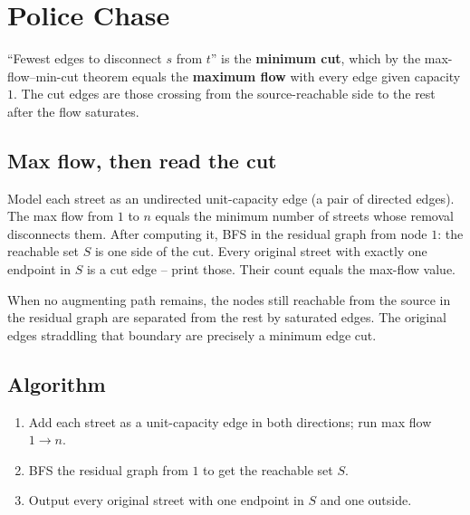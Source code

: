 \section{Police Chase}
\label{sec:cses-police-chase}


\begin{patternbox}
``Fewest edges to disconnect $s$ from $t$'' is the \textbf{minimum cut},
which by the max-flow--min-cut theorem equals the \textbf{maximum flow} with
every edge given capacity $1$. The cut edges are those crossing from the
source-reachable side to the rest after the flow saturates.
\end{patternbox}

\subsection*{Max flow, then read the cut}

Model each street as an undirected unit-capacity edge (a pair of directed
edges). The max flow from $1$ to $n$ equals the minimum number of streets
whose removal disconnects them. After computing it, BFS in the residual
graph from node $1$: the reachable set $S$ is one side of the cut. Every
original street with exactly one endpoint in $S$ is a cut edge -- print
those. Their count equals the max-flow value.

\begin{ideabox}
When no augmenting path remains, the nodes still reachable from the source
in the residual graph are separated from the rest by saturated edges. The
original edges straddling that boundary are precisely a minimum edge cut.
\end{ideabox}

\subsection*{Algorithm}

\begin{enumerate}
  \item Add each street as a unit-capacity edge in both directions; run max
        flow $1\to n$.
  \item BFS the residual graph from $1$ to get the reachable set $S$.
  \item Output every original street with one endpoint in $S$ and one
        outside.
\end{enumerate}

